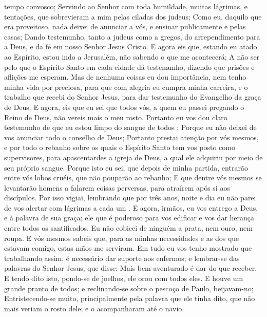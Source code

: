 {{} tempo convosco;
Servindo ao Senhor com toda humildade, muitas lágrimas, e tentações, que sobrevieram a mim pelas ciladas dos judeus;
Como eu, daquilo que
{} era proveitoso, nada deixei de anunciar a vós, e ensinar publicamente e pelas casas;
Dando testemunho, tanto a judeus como a gregos, do arrependimento para
{} a Deus, e da fé em nosso Senhor Jesus Cristo.
E agora eis que, estando eu atado ao Espírito, estou indo a Jerusalém, não sabendo o que me acontecerá;
A não ser pelo que o Espírito Santo em cada cidade
{} dá testemunho, dizendo que prisões e aflições me esperam.
Mas de nenhuma
{} coisas eu dou importância, nem tenho minha vida por preciosa, para que com alegria eu cumpra minha carreira, e o trabalho que recebi do Senhor Jesus, para dar testemunho do Evangelho da graça de Deus.
E agora, eis que eu sei que todos vós, a quem eu passei pregando o Reino de Deus, não vereis mais o meu rosto.
Portanto eu vos dou claro testemunho de que eu estou limpo do sangue de todos
{} ;
Porque eu não deixei de vos anunciar todo o conselho de Deus;
Portanto prestai atenção por vós mesmos, e por todo o rebanho sobre os quais o Espírito Santo tem vos posto como supervisores,
 para apascentardes a igreja de Deus, a qual ele adquiriu por meio de seu próprio sangue.
Porque isto eu sei, que depois de minha partida, entrarão entre vós lobos cruéis, que não pouparão ao rebanho;
E que dentre vós mesmos se levantarão homens a falarem coisas perversas, para atraírem após si aos discípulos.
Por isso vigiai, lembrando que por três anos, noite e dia eu não parei de vos alertar com lágrimas a cada um
{} .
E agora, irmãos, eu vos entrego a Deus, e à palavra de sua graça; ele que é poderoso para vos edificar e vos dar herança entre todos os santificados.
Eu não cobicei de ninguém a prata, nem ouro, nem roupa.
E vós mesmos sabeis que, para as minhas necessidades e as dos que estavam comigo, estas
{} mãos me serviram.
Em tudo eu vos tenho mostrado que trabalhando assim, é necessário dar suporte aos enfermos; e lembrar-se das palavras do Senhor Jesus, que disse: Mais bem-aventurado é dar do que receber.
E tendo dito isto, pondo-se de joelhos, ele orou com todos eles.
E houve um grande pranto de todos; e reclinando-se sobre o pescoço de Paulo, beijavam-no;
Entristecendo-se muito, principalmente pela palavra que ele tinha dito, que não mais veriam o rosto dele; e o acompanharam até o navio.

}
